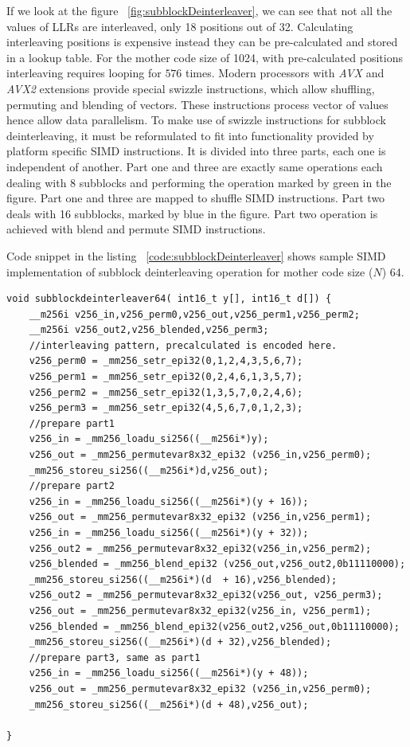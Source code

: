 If we look at the figure ~\ref{fig:subblockDeinterleaver}, we can see that not all the values of LLRs are interleaved, only 18 positions out of 32. Calculating interleaving positions is expensive instead they can be pre-calculated and stored in a lookup table. For the mother code size of 1024, with pre-calculated positions interleaving requires looping for $ 576 $ times. Modern processors with \textit{AVX} and \textit{AVX2} extensions provide special swizzle instructions, which allow shuffling, permuting and blending of vectors. These instructions process vector of values hence allow data parallelism. To make use of swizzle instructions for subblock deinterleaving, it must be reformulated to fit into functionality provided by platform specific SIMD instructions. It is divided into three parts, each one is independent of another. Part one and three are exactly same operations each dealing with 8 subblocks and performing the operation marked by green in the figure. Part one and three are mapped to shuffle SIMD instructions. Part two deals with 16 subblocks, marked by blue in the figure. Part two operation is achieved with blend and permute SIMD instructions.

Code snippet in the listing ~\ref{code:subblockDeinterleaver} shows sample SIMD implementation of subblock deinterleaving operation for mother code size ($N$) 64.

\begin{code}
\label{code:subblockDeinterleaver}
\begin{verbatim}
void subblockdeinterleaver64( int16_t y[], int16_t d[]) {
	__m256i v256_in,v256_perm0,v256_out,v256_perm1,v256_perm2;
	__m256i v256_out2,v256_blended,v256_perm3;
	//interleaving pattern, precalculated is encoded here.
	v256_perm0 = _mm256_setr_epi32(0,1,2,4,3,5,6,7);
	v256_perm1 = _mm256_setr_epi32(0,2,4,6,1,3,5,7);
	v256_perm2 = _mm256_setr_epi32(1,3,5,7,0,2,4,6);
	v256_perm3 = _mm256_setr_epi32(4,5,6,7,0,1,2,3);
	//prepare part1
	v256_in = _mm256_loadu_si256((__m256i*)y);
	v256_out = _mm256_permutevar8x32_epi32 (v256_in,v256_perm0);
	_mm256_storeu_si256((__m256i*)d,v256_out);
	//prepare part2
	v256_in = _mm256_loadu_si256((__m256i*)(y + 16));
	v256_out = _mm256_permutevar8x32_epi32 (v256_in,v256_perm1);
	v256_in = _mm256_loadu_si256((__m256i*)(y + 32));
	v256_out2 = _mm256_permutevar8x32_epi32(v256_in,v256_perm2);
	v256_blended = _mm256_blend_epi32 (v256_out,v256_out2,0b11110000);
	_mm256_storeu_si256((__m256i*)(d  + 16),v256_blended);
	v256_out2 = _mm256_permutevar8x32_epi32(v256_out, v256_perm3);
	v256_out = _mm256_permutevar8x32_epi32(v256_in, v256_perm1);
	v256_blended = _mm256_blend_epi32(v256_out2,v256_out,0b11110000);
	_mm256_storeu_si256((__m256i*)(d + 32),v256_blended);
	//prepare part3, same as part1
	v256_in = _mm256_loadu_si256((__m256i*)(y + 48));
	v256_out = _mm256_permutevar8x32_epi32 (v256_in,v256_perm0);
	_mm256_storeu_si256((__m256i*)(d + 48),v256_out);
		
}
\end{verbatim}
\end{code}

